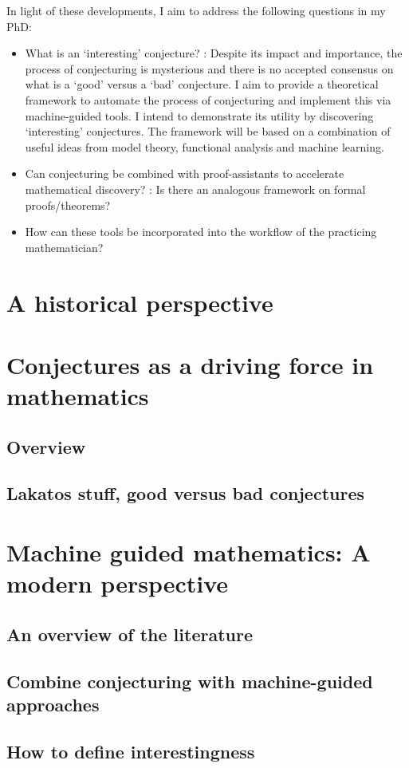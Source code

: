 In light of these developments, I aim to address the following questions in my PhD:
\begin{itemize}
    \item What is an `interesting' conjecture? : Despite its impact and importance, the process of conjecturing is mysterious and there is no accepted consensus on what is a `good' versus a `bad' conjecture. 
    I aim to provide a theoretical framework to automate the process of conjecturing and implement this via machine-guided tools. I intend to demonstrate its utility by discovering `interesting' conjectures. The framework will be based on a combination of useful ideas from model theory, functional analysis and machine learning.
    \item Can conjecturing be combined with proof-assistants to accelerate mathematical discovery? : Is there an analogous framework on formal proofs/theorems?
    \item How can these tools be incorporated into the workflow of the practicing mathematician?
\end{itemize}


\section{A historical perspective}

\section{Conjectures as a driving force in mathematics}
\subsection{Overview}
\subsection{Lakatos stuff, good versus bad conjectures}
\section{Machine guided mathematics: A modern perspective}
\subsection{An overview of the literature}
\subsection{Combine conjecturing with machine-guided approaches}
\subsection{How to define interestingness}